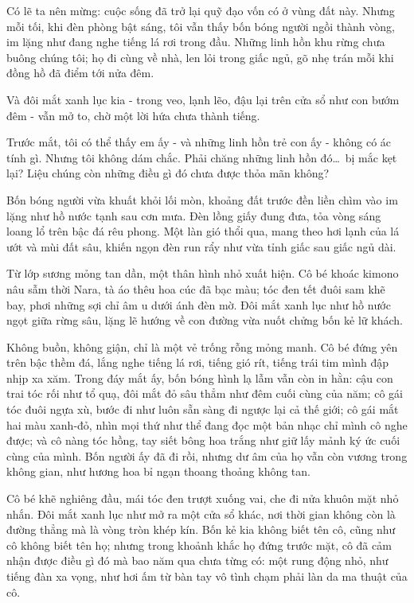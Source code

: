 \documentclass[../main.tex]{subfiles}
\begin{document}
Có lẽ ta nên mừng: cuộc sống đã trở lại quỹ đạo vốn có ở vùng đất này. Nhưng mỗi tối, khi đèn phòng bật sáng, tôi vẫn thấy bốn bóng người ngồi thành vòng, im lặng như đang nghe tiếng lá rơi trong đầu. Những linh hồn khu rừng chưa buông chúng tôi; họ đi cùng về nhà, len lỏi trong giấc ngủ, gõ nhẹ trán mỗi khi đồng hồ đã điểm tới nửa đêm.

Và đôi mắt xanh lục kia - trong veo, lạnh lẽo, đậu lại trên cửa sổ như con bướm đêm - vẫn mở to, chờ một lời hứa chưa thành tiếng.

Trước mắt, tôi có thể thấy em ấy - và những linh hồn trẻ con ấy - không có ác tính gì. Nhưng tôi không dám chắc. Phải chăng những linh hồn đó\dots\ bị mắc kẹt lại? Liệu chúng còn những điều gì đó chưa được thỏa mãn không?

\pov{-}

Bốn bóng người vừa khuất khỏi lối mòn, khoảng đất trước đền liền chìm vào im lặng như hồ nước tạnh sau cơn mưa. Đèn lồng giấy đung đưa, tỏa vòng sáng loang lổ trên bậc đá rêu phong. Một làn gió thổi qua, mang theo hơi lạnh của lá ướt và mùi đất sâu, khiến ngọn đèn run rẩy như vừa tỉnh giấc sau giấc ngủ dài.

Từ lớp sương mỏng tan dần, một thân hình nhỏ xuất hiện. Cô bé khoác kimono nâu sẫm thời Nara, tà áo thêu hoa cúc đã bạc màu; tóc đen tết đuôi sam khẽ bay, phơi những sợi chỉ âm u dưới ánh đèn mờ. Đôi mắt xanh lục như hồ nước ngọt giữa rừng sâu, lặng lẽ hướng về con đường vừa nuốt chửng bốn kẻ lữ khách.

Không buồn, không giận, chỉ là một vẻ trống rỗng mỏng manh. Cô bé đứng yên trên bậc thềm đá, lắng nghe tiếng lá rơi, tiếng gió rít, tiếng trái tim mình đập nhịp xa xăm. Trong đáy mắt ấy, bốn bóng hình lạ lẫm vẫn còn in hằn: cậu con trai tóc rối như tổ quạ, đôi mắt đỏ sâu thẳm như đêm cuối cùng của năm; cô gái tóc đuôi ngựa xù, bước đi như luôn sẵn sàng đi ngược lại cả thế giới; cô gái mắt hai màu xanh-đỏ, nhìn mọi thứ như thể đang đọc một bản nhạc chỉ mình cô nghe được; và cô nàng tóc hồng, tay siết bông hoa trắng như giữ lấy mảnh ký ức cuối cùng của mình. Bốn người ấy đã đi rồi, nhưng dư âm của họ vẫn còn vương trong không gian, như hương hoa bỉ ngạn thoang thoảng không tan.

Cô bé khẽ nghiêng đầu, mái tóc đen trượt xuống vai, che đi nửa khuôn mặt nhỏ nhắn. Đôi mắt xanh lục như mở ra một cửa sổ khác, nơi thời gian không còn là đường thẳng mà là vòng tròn khép kín. Bốn kẻ kia không biết tên cô, cũng như cô không biết tên họ; nhưng trong khoảnh khắc họ đứng trước mặt, cô đã cảm nhận được điều gì đó mà bao năm qua chưa từng có: một rung động nhỏ, như tiếng đàn xa vọng, như hơi ấm từ bàn tay vô tình chạm phải làn da ma thuật của cô.
\end{document}
